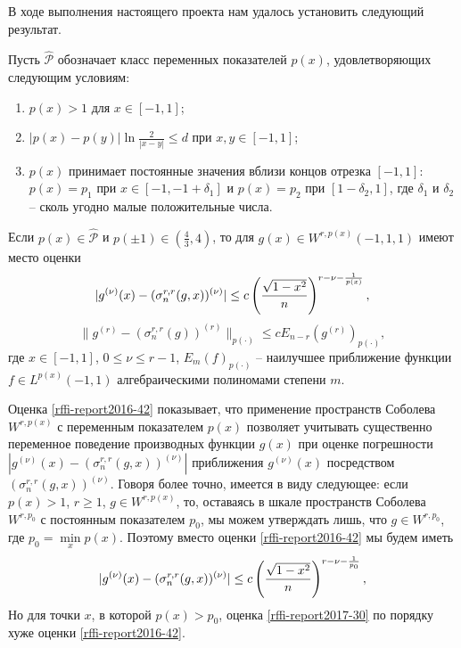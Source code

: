 В ходе выполнения настоящего проекта нам  удалось установить следующий результат.

Пусть $\mathcal{\hat P}$ обозначает класс переменных показателей $p(x)$, удовлетворяющих следующим условиям:
\begin{enumerate}[1)]
\item\label{rffi-report2017-p-cond-1}
$p(x)>1$ для $x\in[-1,1]$;
\item\label{rffi-report2017-p-cond-2}
$|p(x)-p(y)|\ln\frac{2}{|x-y|}\le d$ при $x,y\in[-1,1]$;
\item\label{rffi-report2017-p-cond-3}
$p(x)$  принимает постоянные значения вблизи концов отрезка $[-1,1]$: $p(x)=p_1$ при $x\in[-1,-1+\delta_1]$ и $p(x)=p_2$ при $[1-\delta_2, 1]$, где $\delta_1$ и $\delta_2$ -- сколь угодно малые положительные числа.
\end{enumerate}
\begin{theorem}\label{rffi-report2016-th5}
Если $p(x)\in \mathcal{\hat P}$ и $p(\pm1)\in (\frac43,4)$, то для $g(x)\in W^{r,p(x)}(-1,1,1)$ имеют место оценки
\begin{equation}\label{rffi-report2016-42}
|g^{(\nu)}(x)-(\sigma_n^{r,r}(g,x))^{(\nu)}|\le c\left({\sqrt{1-x^2}\over n}\right)^{r-\nu-\frac{1}{p(x)}} ,
\end{equation}
\begin{equation}\label{rffi-report2017-29}
\|g^{(r)}-(\sigma_n^{r,r}(g))^{(r)}\|_{p(\cdot)}\le cE_{n-r}(g^{(r)})_{p(\cdot)},
\end{equation}
где $ x\in[-1,1]$, $0\le\nu\le r-1$, $E_m(f)_{p(\cdot)}$ -- наилучшее приближение функции $f\in L^{p(x)}(-1,1) $ алгебраическими полиномами степени $m$.
\end{theorem}


Оценка \eqref{rffi-report2016-42} показывает, что применение пространств Соболева  $W^{r,p(x)}$ с переменным показателем $p(x)$ позволяет учитывать существенно переменное поведение производных функции  $g(x)$  при оценке погрешности $|g^{(\nu)}(x)-(\sigma_n^{r,r}(g,x))^{(\nu)}|$ приближения  $g^{(\nu)}(x)$ посредством \linebreak $(\sigma_n^{r,r}(g,x))^{(\nu)}$. Говоря более точно, имеется в виду следующее: если $p(x)>1$, $r\ge1$, $g\in W^{r,p(x)}$, то, оставаясь в шкале пространств Соболева $W^{r,p_0}$ с постоянным показателем $p_0$, мы можем утверждать лишь, что  $g\in W^{r,p_0}$, где $p_0=\min\limits_x p(x)$. Поэтому вместо оценки \eqref{rffi-report2016-42} мы будем иметь
\begin{equation}\label{rffi-report2017-30}
|g^{(\nu)}(x)-(\sigma_n^{r,r}(g,x))^{(\nu)}|\le c\left({\sqrt{1-x^2}\over n}\right)^{r-\nu-\frac{1}{p_0}} ,
\end{equation}
Но для точки $x$, в которой $p(x)>p_0$, оценка \eqref{rffi-report2017-30}  по порядку хуже оценки \eqref{rffi-report2016-42}.

